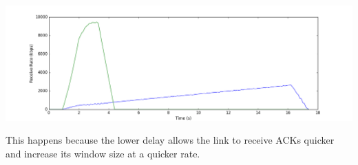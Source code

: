 \documentclass[11pt]{article}
\begin{document}
\vspace{5mm}

\includegraphics[width=17cm]{charts/advanced/competingRtt/rateTime.png}

\vspace{5mm}

This happens because the lower delay allows the link to receive ACKs quicker and increase its window size at a quicker rate.

\vspace{5mm}

\vspace{5mm}
\end{document}
